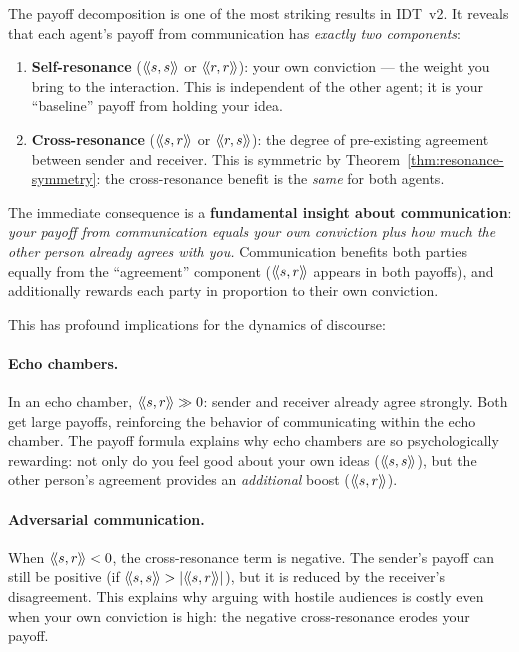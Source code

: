 \begin{interpretation}
\label{interp:payoff}
The payoff decomposition is one of the most striking results in IDT~v2. It
reveals that each agent's payoff from communication has \emph{exactly two
components}:

\begin{enumerate}
\item \textbf{Self-resonance} ($\langle\!\langle s, s \rangle\!\rangle$ or $\langle\!\langle r, r \rangle\!\rangle$): your own conviction
--- the weight you bring to the interaction. This is independent of the other
agent; it is your ``baseline'' payoff from holding your idea.

\item \textbf{Cross-resonance} ($\langle\!\langle s, r \rangle\!\rangle$ or $\langle\!\langle r, s \rangle\!\rangle$): the degree of
pre-existing agreement between sender and receiver. This is symmetric by
Theorem~\ref{thm:resonance-symmetry}: the cross-resonance benefit is the
\emph{same} for both agents.
\end{enumerate}

The immediate consequence is a \textbf{fundamental insight about communication}:
\emph{your payoff from communication equals your own conviction plus how much
the other person already agrees with you.} Communication benefits both parties
equally from the ``agreement'' component ($\langle\!\langle s, r \rangle\!\rangle$ appears in both payoffs),
and additionally rewards each party in proportion to their own conviction.

This has profound implications for the dynamics of discourse:

\paragraph{Echo chambers.} In an echo chamber, $\langle\!\langle s, r \rangle\!\rangle \gg 0$: sender and
receiver already agree strongly. Both get large payoffs, reinforcing the
behavior of communicating within the echo chamber. The payoff formula explains
why echo chambers are so psychologically rewarding: not only do you feel good
about your own ideas ($\langle\!\langle s, s \rangle\!\rangle$), but the other person's agreement provides
an \emph{additional} boost ($\langle\!\langle s, r \rangle\!\rangle$).

\paragraph{Adversarial communication.} When $\langle\!\langle s, r \rangle\!\rangle < 0$, the
cross-resonance term is negative. The sender's payoff can still be positive
(if $\langle\!\langle s, s \rangle\!\rangle > |\langle\!\langle s, r \rangle\!\rangle|$), but it is reduced by the receiver's
disagreement. This explains why arguing with hostile audiences is costly even
when your own conviction is high: the negative cross-resonance erodes your
payoff.


\end{interpretation}
